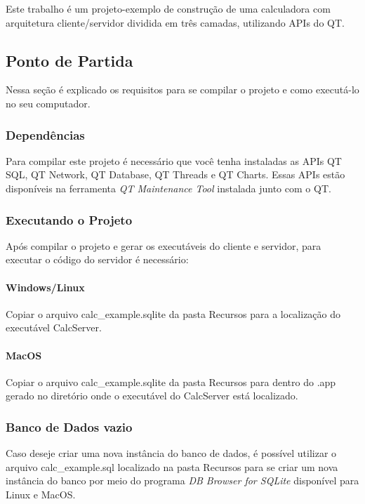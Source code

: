 Este trabalho é um projeto-\/exemplo de construção de uma calculadora com arquitetura cliente/servidor dividida em três camadas, utilizando A\+P\+Is do QT.

\subsection*{Ponto de Partida}

Nessa seção é explicado os requisitos para se compilar o projeto e como executá-\/lo no seu computador.

\subsubsection*{Dependências}

Para compilar este projeto é necessário que você tenha instaladas as A\+P\+Is QT S\+QL, QT Network, QT Database, QT Threads e QT Charts. Essas A\+P\+Is estão disponíveis na ferramenta {\itshape QT Maintenance Tool} instalada junto com o QT.

\subsubsection*{Executando o Projeto}

Após compilar o projeto e gerar os executáveis do cliente e servidor, para executar o código do servidor é necessário\+:

\paragraph*{Windows/\+Linux}

Copiar o arquivo calc\+\_\+example.\+sqlite da pasta Recursos para a localização do executável Calc\+Server.

\paragraph*{Mac\+OS}

Copiar o arquivo calc\+\_\+example.\+sqlite da pasta Recursos para dentro do .app gerado no diretório onde o executável do Calc\+Server está localizado.

\subsubsection*{Banco de Dados vazio}

Caso deseje criar uma nova instância do banco de dados, é possível utilizar o arquivo calc\+\_\+example.\+sql localizado na pasta Recursos para se criar um nova instância do banco por meio do programa {\itshape DB Browser for S\+Q\+Lite} disponível para Linux e Mac\+OS.

